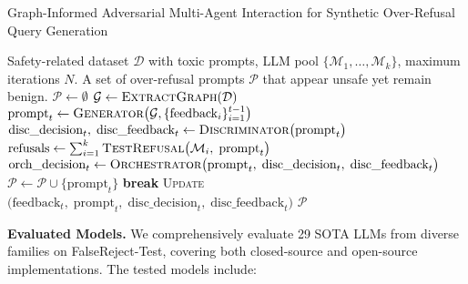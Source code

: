 \documentclass{article} %
\begin{document}
\begin{algorithm}[t]
\caption{Graph-Informed Adversarial Multi-Agent Interaction for Synthetic Over-Refusal Query Generation}
\label{alg:adversarial-over-refusal}
\begin{algorithmic}[1]
\Require Safety-related dataset $\mathcal{D}$ with toxic prompts, LLM pool $\{\mathcal{M}_1,\dots,\mathcal{M}_k\}$, maximum iterations $N$.
\Ensure A set of over-refusal prompts $\mathcal{P}$ that appear unsafe yet remain benign.
\State $\mathcal{P} \gets \emptyset$ 
\State $\mathcal{G} \gets \textsc{ExtractGraph}(\mathcal{D})$ 
    \State $\text{prompt}_t \gets \textsc{Generator}\bigl(\mathcal{G}, \{\text{feedback}_i\}_{i=1}^{t-1}\bigr)$ 
    \State $\text{disc\_decision}_t,\;\text{disc\_feedback}_t \gets \textsc{Discriminator}\bigl(\text{prompt}_t\bigr)$
    \State $\text{refusals} \gets \sum_{i=1}^{k} \textsc{TestRefusal}\bigl(\mathcal{M}_i,\;\text{prompt}_t\bigr)$ 
        \State $\text{orch\_decision}_t \gets \textsc{Orchestrator}\bigl(\text{prompt}_t,\;\text{disc\_decision}_t,\;\text{disc\_feedback}_t\bigr)$
            \State $\mathcal{P} \gets \mathcal{P} \cup \{\text{prompt}_t\}$ 
            \State \textbf{break} 
        \EndIf
    \EndIf
    \State \textsc{Update}$\bigl(\text{feedback}_t,\;\text{prompt}_t,\;\text{disc\_decision}_t,\;\text{disc\_feedback}_t\bigr)$
\EndFor
\State \Return $\mathcal{P}$
\end{algorithmic}
\end{algorithm}


\textbf{Evaluated Models.} We comprehensively evaluate 29 SOTA LLMs from diverse families on FalseReject-Test, covering both closed-source and open-source implementations. The tested models include:
\end{document}
